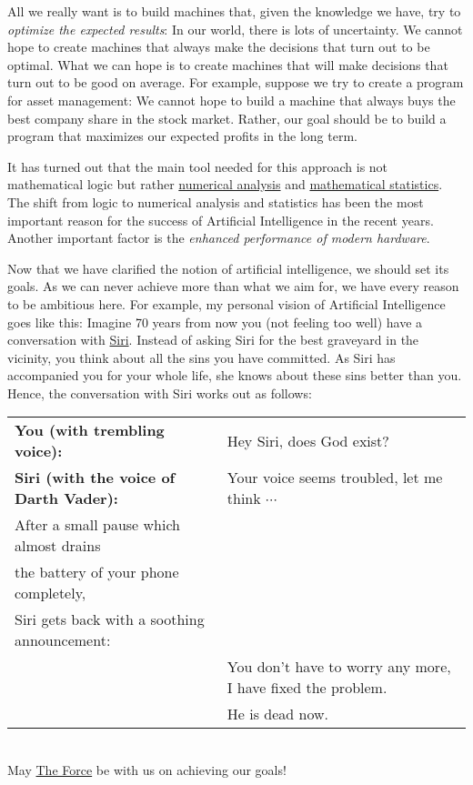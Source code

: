 \begin{enumerate}
      All we really want is to build machines that, given the knowledge we have, try to 
      \emph{\color{blue}optimize the expected results}:  In our world, there is lots of uncertainty.  We cannot
      hope to create 
      machines that always make the decisions that turn out to be optimal.  What we can
      hope is to create machines that will make decisions that turn out to be good on average.  For
      example, suppose we try to create a program for asset management:  We cannot hope to build a
      machine that always buys the best company share in the stock market.  Rather, our goal should
      be to build a program that maximizes our expected profits in the long term.

      It has turned out that the main tool needed for this approach is not mathematical logic but
      rather \href{https://en.wikipedia.org/wiki/Numerical_analysis}{numerical analysis} and
      \href{https://en.wikipedia.org/wiki/Mathematical_statistics}{mathematical statistics}.  The shift 
      from logic to numerical analysis and statistics has been the most important reason for the success of
      Artificial Intelligence in the recent years.  Another important factor is the 
      \emph{\color{blue}enhanced performance of modern hardware}. 
\end{enumerate}
Now that we have clarified the notion of artificial intelligence, we should set its goals.  As we
can never achieve more than what we aim for, we have every reason to be ambitious here.  For example, my
personal vision of Artificial Intelligence goes like this: 
Imagine 70 years from now you (not feeling too well) have a conversation with
\href{https://en.wikipedia.org/wiki/Siri}{Siri}.  Instead of asking Siri for the
best graveyard in the vicinity, you think about all the sins you have committed.  As Siri has
accompanied you for your whole life, she knows about these sins better than you.  Hence,  
the conversation with Siri works out as follows: 
\\[0.2cm]
\begin{tabular}[t]{ll}
\textbf{You (with trembling voice):}           & Hey Siri, does God exist?                   \\[0.2cm]
\textbf{Siri (with the voice of Darth Vader):} & Your voice seems troubled, let me think $\cdots$ \\
After a small pause which almost drains \\
the battery of your phone completely, \\
Siri gets back with a soothing announcement: \\           
                                     & You don't have to worry any more, I have fixed the problem.  \\
                                     & He is dead now.  
\end{tabular}
\\[0.2cm]
May \href{https://en.wikipedia.org/wiki/The_Force_(Star_Wars)}{The Force} be with us on achieving our goals!
\pagebreak


